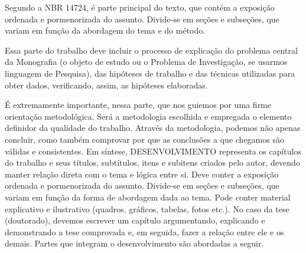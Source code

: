 Segundo a NBR 14724, é parte principal do texto, que contém a exposição
ordenada e pormenorizada do assunto. Divide-se em seções e subseções, que variam em função da abordagem do tema e do método.

Essa parte do trabalho deve incluir o processo de explicação do problema central da Monografia (o objeto de estudo ou o Problema de Investigação, se usarmos linguagem de Pesquisa), das hipóteses de trabalho e das técnicas utilizadas para obter dados, verificando, assim, as hipóteses elaboradas.

É extremamente importante, nessa parte, que nos guiemos por uma firme
orientação metodológica. Será a metodologia escolhida e empregada o elemento definidor da qualidade do trabalho. Através da metodologia, podemos não apenas concluir, como também comprovar por que as conclusões a que chegamos são válidas e consistentes.
Em síntese, DESENVOLVIMENTO representa os capítulos do trabalho e seus títulos, subtítulos, itens e subitens criados pelo autor, devendo manter relação direta com o tema e lógica entre si. Deve conter a exposição ordenada e pormenorizada do assunto. Divide-se em seções e subseções, que variam em função da forma de abordagem dada ao tema. Pode conter material explicativo e ilustrativo (quadros, gráficos, tabelas, fotos etc.). No caso da tese (doutorado), devemos escrever um
capítulo argumentando, explicando e demonstrando a tese comprovada e, em seguida, fazer a relação entre ele e os demais.
Partes que integram o desenvolvimento são abordadas a seguir.




